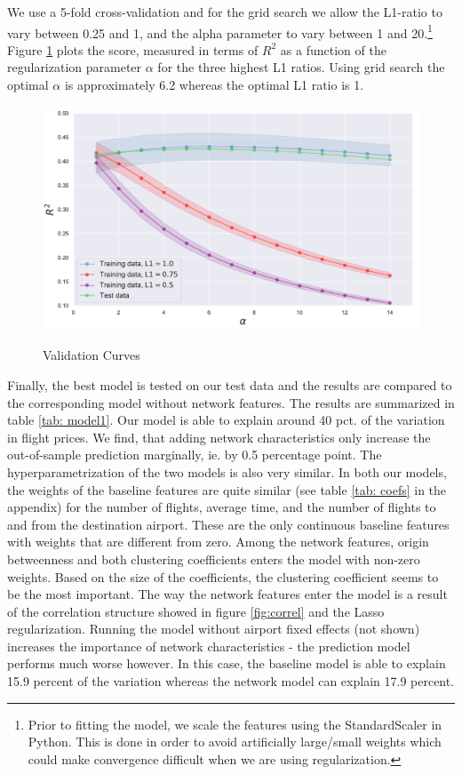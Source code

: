 We use a 5-fold cross-validation and for the grid search we allow the L1-ratio to vary between 0.25 and 1, and the alpha parameter to vary between 1 and 20.\footnote{Prior to fitting the model, we scale the features using the StandardScaler in Python. This is done in order to avoid artificially large/small weights which could make convergence difficult when we are using regularization.} 
Figure \ref{fig:validation curve} plots the score, measured in terms of $R^2$ as a function of the regularization parameter $\alpha$ for the three highest L1 ratios. Using grid search the optimal $\alpha$ is approximately 6.2 whereas the optimal L1 ratio is 1. \\ %
\begin{figure}[H]
  \centering
  \caption{Validation Curves}
    \includegraphics[width=1. \textwidth]{Exam/Figures/validation_curve.pdf}
  \label{fig:validation curve}
\end{figure}
Finally, the best model is tested on our test data and the results are compared to the corresponding model without network features. The results are summarized in table \ref{tab: model1}. Our model is able to explain around 40 pct. of the variation in flight prices. We find, that adding network characteristics only increase the out-of-sample prediction marginally, ie. by 0.5 percentage point. The hyperparametrization of the two models is also very similar. In both our models, the weights of the baseline features are quite similar (see table \ref{tab: coefs} in the appendix) for the number of flights, average time, and the number of flights to and from the destination airport. These are the only continuous baseline features with weights that are different from zero. Among the network  features, origin betweenness and both clustering coefficients enters the model with non-zero weights. Based on the size of the coefficients, the clustering coefficient seems to be the most important. The way the network features enter the model is a result of the correlation structure showed in figure \ref{fig:correl} and the Lasso regularization. Running the model without airport fixed effects (not shown) increases the importance of network characteristics - the prediction model performs much worse however. In this case, the baseline model is able to explain 15.9 percent of the variation whereas the network model can explain 17.9 percent. 


